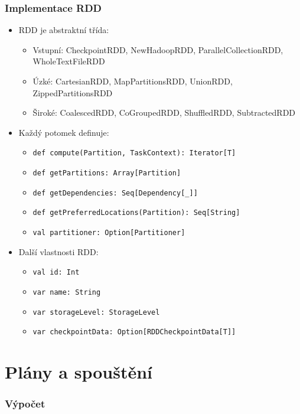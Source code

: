 \documentclass[xcolor=dvipsnames,compact]{beamer}
\begin{document}
\begin{frame}[fragile]
	\frametitle{Implementace RDD}
	\begin{itemize}
		\item RDD je abstraktní třída:
		\begin{itemize}
			\item Vstupní: CheckpointRDD, NewHadoopRDD, ParallelCollectionRDD, WholeTextFileRDD
			\item Úzké: CartesianRDD, MapPartitionsRDD, UnionRDD, ZippedPartitionsRDD
			\item Široké: CoalescedRDD, CoGroupedRDD, ShuffledRDD, SubtractedRDD
		\end{itemize}
		\item Každý potomek definuje:
		\begin{itemize}
			\item \verb|def compute(Partition, TaskContext): Iterator[T]|
			\item \verb|def getPartitions: Array[Partition]|
			\item \verb|def getDependencies: Seq[Dependency[_]]|
			\item \verb|def getPreferredLocations(Partition): Seq[String]|
			\item \verb|val partitioner: Option[Partitioner]|
		\end{itemize}
		\item Další vlastnosti RDD:
		\begin{itemize}
			\item \verb|val id: Int|
			\item \verb|var name: String|
			\item \verb|var storageLevel: StorageLevel|
			\item \verb|var checkpointData: Option[RDDCheckpointData[T]]|
		\end{itemize}
	\end{itemize}
\end{frame}

\section{Plány a spouštění}

\begin{frame}
	\frametitle{Výpočet} 
	\begin{center}
	\end{center}
\end{frame}
\end{document}
